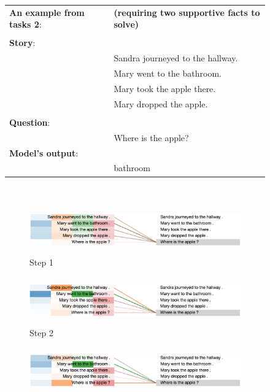 \begin{figure}[!h]
\label{fig:ex2}
\begin{minipage}{\textwidth}
\fontsize{8}{8}\selectfont
\begin{tabular}{l l}
\textbf{An example from tasks 2}: & \textbf{(requiring two supportive facts to solve)}\\
\\
\textbf{Story}: & \\
& Sandra journeyed to the hallway. \\
& Mary went to the bathroom. \\
& Mary took the apple there. \\
& Mary dropped the apple. \\
\\
\textbf{Question}: & \\
& Where is the apple? \\
\textbf{Model's output}: & \\
& bathroom
\end{tabular}
\end{minipage}
\\  \vfill
\vspace{20pt} %
\begin{minipage}{\textwidth}
    \centering
    \begin{subfigure}[t]{\textwidth}
        \centering
        \includegraphics[height=0.8in]{04-part-03/chapter-06/figs_and_tables/figs_attention_babi/e2-step1}
        \caption{Step 1}
    \end{subfigure}%
    \hfill \hfill
    \begin{subfigure}[t]{\textwidth}
        \centering
        \includegraphics[height=0.8in]{04-part-03/chapter-06/figs_and_tables/figs_attention_babi/e2-step2}
        \caption{Step 2}
    \end{subfigure}
    \hfill \hfill
    \begin{subfigure}[t]{\textwidth}
        \centering
        \includegraphics[height=0.8in]{04-part-03/chapter-06/figs_and_tables/figs_attention_babi/e2-step3}

\end{subfigure}
\end{minipage}
\end{figure}
